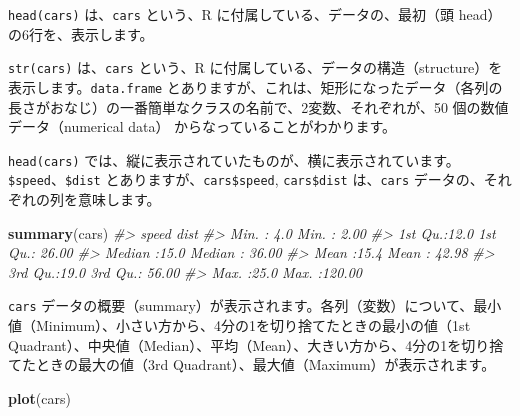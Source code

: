 \documentclass[
  xelatex, ja=standard]{bxjsbook}
\newenvironment{Shaded}{\begin{snugshade}}{\end{snugshade}}
\newcommand{\CommentTok}[1]{\textcolor[rgb]{0.56,0.35,0.01}{\textit{#1}}}
\newcommand{\FunctionTok}[1]{\textcolor[rgb]{0.13,0.29,0.53}{\textbf{#1}}}
\newcommand{\NormalTok}[1]{#1}
\theoremstyle{definition}
\theoremstyle{definition}
\theoremstyle{definition}
\theoremstyle{definition}
\theoremstyle{remark}
\begin{document}
\texttt{head(cars)} は、\texttt{cars} という、R に付属している、データの、最初（頭 head）の6行を、表示します。

\begin{Shaded}
\end{Shaded}

\texttt{str(cars)} は、\texttt{cars} という、R に付属している、データの構造（structure）を表示します。\texttt{data.frame} とありますが、これは、矩形になったデータ（各列の長さがおなじ）の一番簡単なクラスの名前で、2変数、それぞれが、50 個の数値データ（numerical data） からなっていることがわかります。

\texttt{head(cars)} では、縦に表示されていたものが、横に表示されています。\texttt{\$speed}、\texttt{\$dist} とありますが、\texttt{cars\$speed}, \texttt{cars\$dist} は、\texttt{cars} データの、それぞれの列を意味します。

\begin{Shaded}
\begin{Highlighting}[]
\FunctionTok{summary}\NormalTok{(cars)}
\CommentTok{\#\textgreater{}      speed           dist       }
\CommentTok{\#\textgreater{}  Min.   : 4.0   Min.   :  2.00  }
\CommentTok{\#\textgreater{}  1st Qu.:12.0   1st Qu.: 26.00  }
\CommentTok{\#\textgreater{}  Median :15.0   Median : 36.00  }
\CommentTok{\#\textgreater{}  Mean   :15.4   Mean   : 42.98  }
\CommentTok{\#\textgreater{}  3rd Qu.:19.0   3rd Qu.: 56.00  }
\CommentTok{\#\textgreater{}  Max.   :25.0   Max.   :120.00}
\end{Highlighting}
\end{Shaded}

\texttt{cars} データの概要（summary）が表示されます。各列（変数）について、最小値（Minimum）、小さい方から、4分の1を切り捨てたときの最小の値（1st Quadrant）、中央値（Median）、平均（Mean）、大きい方から、4分の1を切り捨てたときの最大の値（3rd Quadrant）、最大値（Maximum）が表示されます。

\begin{Shaded}
\begin{Highlighting}[]
\FunctionTok{plot}\NormalTok{(cars)}
\end{Highlighting}
\end{Shaded}
\end{document}
